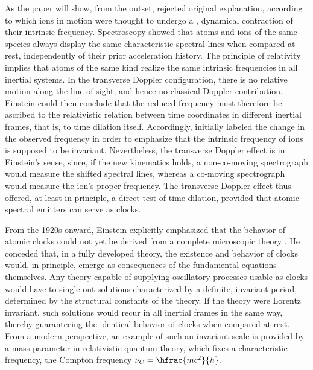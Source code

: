 \documentclass[submitted,12pt]{article}
\newcommand{\tDe}{transverse Doppler effect\xspace}
\begin{document}
As the paper will show, from the outset, \citet{Einstein1907d} rejected  original explanation, according to which ions in motion were thought to undergo a , dynamical contraction of their intrinsic frequency. Spectroscopy showed that atoms and ions of the same species always display the same characteristic spectral lines when compared at rest, independently of their prior acceleration history. The principle of relativity implies that atoms of the same kind realize the same intrinsic frequencies in all inertial systems. In the transverse Doppler configuration, there is no relative motion along the line of sight, and hence no classical Doppler contribution. Einstein could then conclude that the reduced frequency must therefore be ascribed to the relativistic relation between time coordinates in different inertial frames, that is, to time dilation itself. Accordingly, \textcites[422]{Einstein1908}[133]{Einstein1910} initially labeled the change in the observed frequency  in order to emphasize that the intrinsic frequency of ions is supposed to be invariant. Nevertheless, the \tDe is  in Einstein’s sense, since, if the new kinematics holds, a non-co-moving spectrograph would measure the shifted spectral lines, whereas a co-moving spectrograph would measure the ion's proper frequency. The transverse Doppler effect thus offered, at least in principle, a direct test of time dilation, provided that atomic spectral emitters can serve as  clocks.

From the 1920s onward, Einstein explicitly emphasized that the behavior of atomic clocks could not yet be derived from a complete microscopic theory . He conceded that, in a fully developed theory, the existence and behavior of clocks would, in principle, emerge as consequences of the fundamental equations themselves. Any theory capable of supplying oscillatory processes usable as clocks would have to single out solutions characterized by a definite, invariant period, determined by the structural constants of the theory. If the theory were Lorentz invariant, such solutions would recur in all inertial frames in the same way, thereby guaranteeing the identical behavior of clocks when compared at rest. From a modern perspective, an example of such an invariant scale is provided by a mass parameter in relativistic quantum theory, which fixes a characteristic frequency, the Compton frequency $\nu_C=\hfrac{mc^2}{h}$.  
\end{document}
